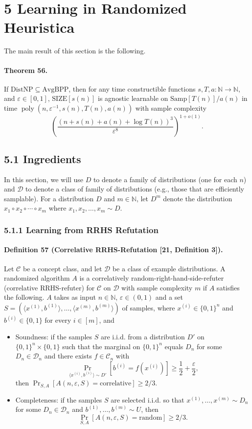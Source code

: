 \section*{5 Learning in Randomized Heuristica}
The main result of this section is the following.
\paragraph{Theorem 56.} If $\mathrm{DistNP}\subseteq\mathrm{AvgBPP}$, then for any time constructible functions $s,T,a:\mathbb N\to\mathbb N$, and $\varepsilon\in[0,1]$, $\mathrm{SIZE}[s(n)]$ is agnostic learnable on $\mathrm{Samp}[T(n)]/a(n)$ in time $\operatorname{poly}(n,\varepsilon^{-1},s(n),T(n),a(n))$ with sample complexity
\[\left(\frac{(n+s(n)+a(n)+\log T(n))^3}{\varepsilon^8}\right)^{1+o(1)}.\]
\subsection*{5.1 Ingredients}
In this section, we will use $D$ to denote a family of distributions (one for each $n$) and $\mathcal D$ to denote a class of family of distributions (e.g., those that are efficiently samplable). For a distribution $D$ and $m\in\mathbb N$, let $D^m$ denote the distribution $x_1\circ x_2\circ\cdots\circ x_m$ where $x_1,x_2,\ldots,x_m\sim D$.
\subsubsection*{5.1.1 Learning from RRHS Refutation}
\paragraph{Definition 57 (Correlative RRHS-Refutation [21, Definition 3]).} Let $\mathcal C$ be a concept class, and let $\mathcal D$ be a class of example distributions. A randomized algorithm $A$ is a correlatively random-right-hand-side-refuter (correlative RRHS-refuter) for $\mathcal C$ on $\mathcal D$ with sample complexity $m$ if $A$ satisfies the following. $A$ takes as input $n\in\mathbb N$, $\varepsilon\in(0,1)$ and a set $S=(\langle x^{(1)},b^{(1)}\rangle,\ldots,\langle x^{(m)},b^{(m)}\rangle)$ of samples, where $x^{(i)}\in\{0,1\}^n$ and $b^{(i)}\in\{0,1\}$ for every $i\in[m]$, and
\begin{itemize}
\item Soundness: if the samples $S$ are i.i.d. from a distribution $D'$ on $\{0,1\}^n\times\{0,1\}$ such that the marginal on $\{0,1\}^n$ equals $D_n$ for some $D_n\in\mathcal D_n$ and there exists $f\in\mathcal C_n$ with
\[\Pr_{\langle x^{(i)},b^{(i)}\rangle\sim D'}[b^{(i)}=f(x^{(i)})]\geq\frac12+\frac\varepsilon2,\]
then $\Pr_{S,A}[A(n,\varepsilon,S)=\text{correlative}]\geq2/3$.
\item Completeness: if the samples $S$ are selected i.i.d. so that $x^{(1)},\ldots,x^{(m)}\sim D_n$ for some $D_n\in\mathcal D_n$ and $b^{(1)},\ldots,b^{(m)}\sim U$, then
\[\Pr_{S,A}[A(n,\varepsilon,S)=\text{random}]\geq2/3.\]
\end{itemize}

